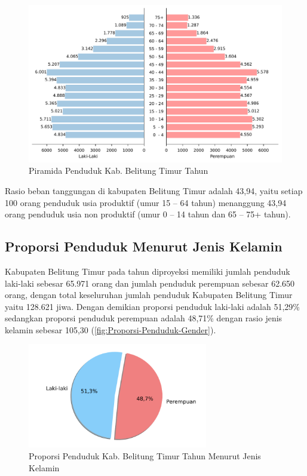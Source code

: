 \begin{figure}[!h]
    \centering{}
    \includegraphics[width=\textwidth]{bab_01/bab_01_1_piramidaPenduduk}
    \caption{Piramida Penduduk Kab. Belitung Timur Tahun \tP}
    \label{fig:Piramida-Penduduk-2022}
\end{figure}

Rasio beban tanggungan di kabupaten Belitung Timur adalah 43,94, yaitu setiap 100 orang penduduk usia produktif (umur 15 – 64 tahun) menanggung 43,94 orang penduduk usia non produktif (umur 0 – 14 tahun dan 65 – 75+ tahun).

\subsection{Proporsi Penduduk Menurut Jenis Kelamin}
Kabupaten Belitung Timur pada tahun \tP diproyeksi memiliki jumlah penduduk laki-laki sebesar 65.971 orang dan jumlah penduduk perempuan sebesar 62.650 orang, dengan total keseluruhan jumlah penduduk Kabupaten Belitung Timur yaitu 128.621 jiwa. Dengan demikian proporsi penduduk laki-laki adalah 51,29\% sedangkan proporsi penduduk perempuan adalah 48,71\% dengan rasio jenis kelamin sebesar 105,30 (\autoref{fig:Proporsi-Penduduk-Gender}).

\begin{figure}[!h]
    \centering{}
    \includegraphics[width=0.7\textwidth]{bab_01/bab_01_2_distribusiGender}
    \caption{Proporsi Penduduk Kab. Belitung Timur  Tahun \tP Menurut Jenis Kelamin}
    \label{fig:Proporsi-Penduduk-Gender}
\end{figure}

